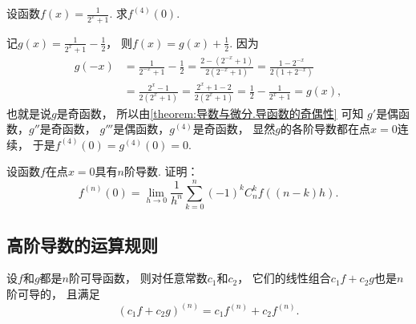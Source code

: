 \begin{example}
设函数\(f(x) = \frac1{2^x+1}\).
求\(f^{(4)}(0)\).
\begin{solution}
记\(g(x) = \frac1{2^x+1} - \frac12\)，
则\(f(x) = g(x) + \frac12\).
因为\begin{align*}
	g(-x) &= \frac1{2^{-x}+1} - \frac12
	= \frac{2-(2^{-x}+1)}{2(2^{-x}+1)}
	= \frac{1-2^{-x}}{2(1+2^{-x})} \\
	&= \frac{2^x-1}{2(2^x+1)}
	= \frac{2^x+1-2}{2(2^x+1)}
	= \frac12 - \frac1{2^x+1}
	= g(x),
\end{align*}
也就是说\(g\)是奇函数，
所以由\cref{theorem:导数与微分.导函数的奇偶性} 可知
\(g'\)是偶函数，\(g''\)是奇函数，
\(g'''\)是偶函数，\(g^{(4)}\)是奇函数，
显然\(g\)的各阶导数都在点\(x=0\)连续，
于是\(f^{(4)}(0) = g^{(4)}(0) = 0\).
\end{solution}
\end{example}

\begin{example}
设函数\(f\)在点\(x=0\)具有\(n\)阶导数.
证明：\begin{equation}\label{equation:高阶导数.高阶导数与差分的联系}
	f^{(n)}(0)
	= \lim_{h\to0} \frac1{h^n} \sum_{k=0}^n (-1)^k C_n^k f((n-k)h).
\end{equation}
\end{example}

\subsection{高阶导数的运算规则}
\begin{theorem}
设\(f\)和\(g\)都是\(n\)阶可导函数，
则对任意常数\(c_1\)和\(c_2\)，
它们的线性组合\(c_1 f + c_2 g\)也是\(n\)阶可导的，
且满足\begin{equation}
	(c_1 f + c_2 g)^{(n)}
	= c_1 f^{(n)} + c_2 f^{(n)}.
\end{equation}
\end{theorem}

